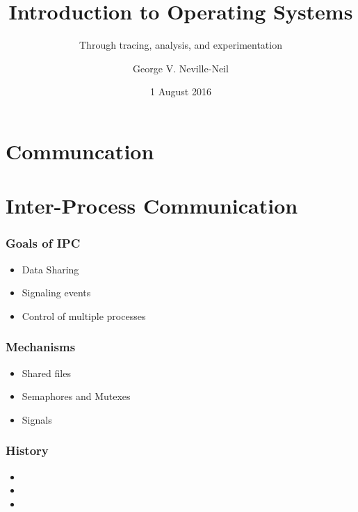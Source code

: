 
\usepackage[english]{babel}
\usepackage[latin1]{inputenc}
\usepackage{graphicx}
\usepackage{times}
\usepackage[T1]{fontenc}
\usepackage{fancyvrb}
\usepackage{listings}


\title{Introduction to Operating Systems}
\subtitle{Through tracing, analysis, and experimentation}
\author{George V. Neville-Neil}
\date{1 August 2016}

\begin{frame}
  \titlepage
\end{frame}

\section{Communcation}
\label{sec:communication}

\section{Inter-Process Communication}
\label{sec:ipc}

\begin{frame}
  \frametitle{Goals of IPC}
  \begin{itemize}
  \item Data Sharing
  \item Signaling events
  \item Control of multiple processes
  \end{itemize}
\end{frame}

\begin{frame}
  \frametitle{Mechanisms}
  \begin{itemize}
  \item Shared files
  \item Semaphores and Mutexes
  \item Signals
  \end{itemize}
\end{frame}

\begin{frame}
  \frametitle{History}
  \begin{itemize}
  \item 
  \item 
  \item 
  \end{itemize}
\end{frame}

